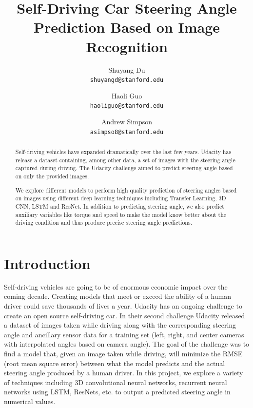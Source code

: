 \documentclass[10pt,twocolumn,letterpaper]{article}
\begin{document}
\title{Self-Driving Car Steering Angle Prediction Based on Image Recognition}

\author{Shuyang Du\\
{\tt\small shuyangd@stanford.edu}
\and
Haoli Guo\\
{\tt\small haoliguo@stanford.edu}
\and
Andrew Simpson\\
{\tt\small asimpso8@stanford.edu}
}

\maketitle

\begin{abstract}
Self-driving vehicles have expanded dramatically over the last few years. Udacity has release a dataset containing, among other data, a set of images with the steering angle captured during driving. The Udacity challenge aimed to predict steering angle based on only the provided images. 

We explore different models to perform high quality prediction of steering angles based on images using different deep learning techniques including Transfer Learning, 3D CNN, LSTM and ResNet. In addition to predicting steering angle, we also predict auxiliary variables like torque and speed to make the model know better about the driving condition and thus produce precise steering angle predictions.

\end{abstract}

\section{Introduction}
Self-driving vehicles are going to be of enormous economic impact over the coming decade. Creating models that meet or exceed the ability of a human driver could save thousands of lives a year. Udacity has an ongoing challenge to create an open source self-driving car. In their second challenge Udacity released a dataset of images taken while driving along with the corresponding steering angle and ancillary sensor data for a training set (left, right, and center cameras with interpolated angles based on camera angle). The goal of the challenge was to find a model that, given an image taken while driving, will minimize the RMSE (root mean square error) between what the model predicts and the actual steering angle produced by a human driver. In this project, we explore a variety of techniques including 3D convolutional neural networks, recurrent neural networks using LSTM, ResNets, etc. to output a predicted steering angle in numerical values.
\end{document}
